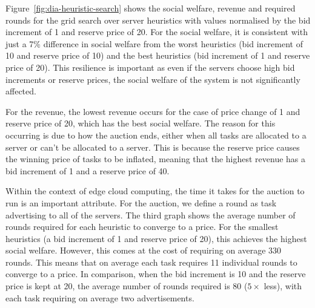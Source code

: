 
Figure~\ref{fig:dia-heuristic-search} shows the social welfare, revenue and required rounds for the grid search over server heuristics with values normalised by the bid increment of 1 and reserve price of 20. For the social welfare, it is consistent with just a 7\% difference in social welfare from the worst heuristics (bid increment of 10 and reserve price of 10) and the best heuristics (bid increment of 1 and reserve price of 20). This resilience is important as even if the servers choose high bid increments or reserve prices, the social welfare of the system is not significantly affected. 

For the revenue, the lowest revenue occurs for the case of price change of 1 and reserve price of 20, which has the best social welfare. The reason for this occurring is due to how the auction ends, either when all tasks are allocated to a server or can't be allocated to a server. This is because the reserve price causes the winning price of tasks to be inflated, meaning that the highest revenue has a bid increment of 1 and a reserve price of 40.  
 
Within the context of edge cloud computing, the time it takes for the auction to run is an important attribute. For the auction, we define a round as task advertising to all of the servers. The third graph shows the average number of rounds required for each heuristic to converge to a price. For the smallest heuristics (a bid increment of 1 and reserve price of 20), this achieves the highest social welfare. However, this comes at the cost of requiring on average 330 rounds. This means that on average each task requires 11 individual rounds to converge to a price. In comparison, when the bid increment is 10 and the reserve price is kept at 20, the average number of rounds required is 80 ($5\times$ less), with each task requiring on average two advertisements.

